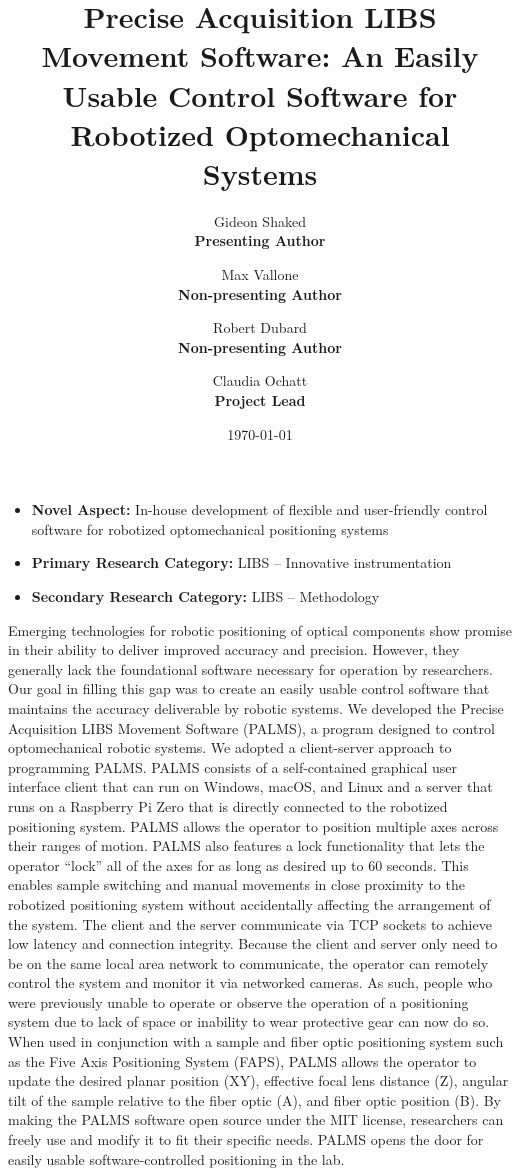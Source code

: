 \documentclass[12pt]{article}
\title{Precise Acquisition LIBS Movement Software: An Easily Usable Control Software for Robotized Optomechanical Systems}
\author{
    Gideon Shaked \\ \textbf{Presenting Author} \and
    Max Vallone \\ \textbf{Non-presenting Author} \and
    Robert Dubard \\ \textbf{Non-presenting Author} \and
    Claudia Ochatt \\ \textbf{Project Lead}
}
\date{\today}
\begin{document}
    \maketitle

    \begin{itemize}
        \item \textbf{Novel Aspect:} In-house development of flexible and user-friendly control software for robotized optomechanical positioning systems
        \item \textbf{Primary Research Category:} LIBS -- Innovative instrumentation
        \item \textbf{Secondary Research Category:} LIBS -- Methodology
    \end{itemize}

    Emerging technologies for robotic positioning of optical components show promise in their ability to deliver improved accuracy and precision. 
    However, 
    they generally lack the foundational software necessary for operation by researchers. 
    Our goal in filling this gap was to 
    create an easily usable control software that maintains the accuracy deliverable by robotic systems. 
    We developed the Precise Acquisition LIBS Movement Software (PALMS), 
    a program designed to control optomechanical robotic systems. 
    We adopted a client-server approach to programming PALMS\@. 
    PALMS consists of a self-contained graphical user interface client that can run on 
    Windows, 
    macOS, 
    and Linux 
    and a server that runs on a Raspberry Pi Zero 
    that is directly connected to the robotized positioning system. 
    PALMS allows the operator to position multiple axes across their ranges of motion. 
    PALMS also features a lock functionality that lets the operator \enquote{lock} all of the axes for as long as desired up to 60 seconds. 
    This enables sample switching 
    and manual movements 
    in close proximity to the robotized positioning system 
    without accidentally affecting the arrangement of the system. 
    The client and the server communicate via TCP sockets to achieve low latency and connection integrity. 
    Because the client and server only need to be on the same local area network to communicate, 
    the operator can remotely control the system and monitor it via networked cameras. 
    As such, people who were previously unable to operate or observe the operation of a positioning system 
    due to lack of space or inability to wear protective gear 
    can now do so. 
    When used in conjunction with a sample and fiber optic positioning system 
    such as the Five Axis Positioning System (FAPS), 
    PALMS allows the operator to update the desired planar position (XY), 
    effective focal lens distance (Z), 
    angular tilt of the sample relative to the fiber optic (A), 
    and fiber optic position (B). 
    By making the PALMS software open source under the MIT license, 
    researchers can freely use and modify it to fit their specific needs. 
    PALMS opens the door for easily usable software-controlled positioning in the lab.
\end{document}
